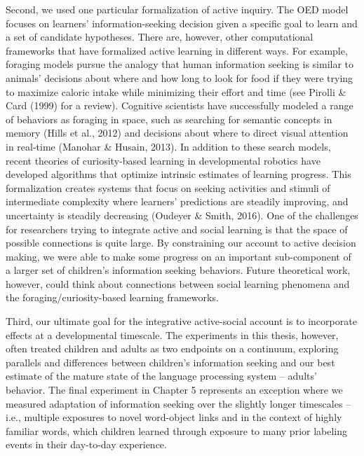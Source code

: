 \documentclass[oneside]{report}
\begin{document}
Second, we used one particular formalization of active inquiry. The OED
model focuses on learners' information-seeking decision given a specific
goal to learn and a set of candidate hypotheses. There are, however,
other computational frameworks that have formalized active learning in
different ways. For example, foraging models pursue the analogy that
human information seeking is similar to animals' decisions about where
and how long to look for food if they were trying to maximize caloric
intake while minimizing their effort and time (see Pirolli \& Card
(1999) for a review). Cognitive scientists have successfully modeled a
range of behaviors as foraging in space, such as searching for semantic
concepts in memory (Hills et al., 2012) and decisions about where to
direct visual attention in real-time (Manohar \& Husain, 2013). In
addition to these search models, recent theories of curiosity-based
learning in developmental robotics have developed algorithms that
optimize intrinsic estimates of learning progress. This formalization
creates systems that focus on seeking activities and stimuli of
intermediate complexity where learners' predictions are steadily
improving, and uncertainty is steadily decreasing (Oudeyer \& Smith,
2016). One of the challenges for researchers trying to integrate active
and social learning is that the space of possible connections is quite
large. By constraining our account to active decision making, we were
able to make some progress on an important sub-component of a larger set
of children's information seeking behaviors. Future theoretical work,
however, could think about connections between social learning phenomena
and the foraging/curiosity-based learning frameworks.

Third, our ultimate goal for the integrative active-social account is to
incorporate effects at a developmental timescale. The experiments in
this thesis, however, often treated children and adults as two endpoints
on a continuum, exploring parallels and differences between children's
information seeking and our best estimate of the mature state of the
language processing system -- adults' behavior. The final experiment in
Chapter 5 represents an exception where we measured adaptation of
information seeking over the slightly longer timescales -- i.e.,
multiple exposures to novel word-object links and in the context of
highly familiar words, which children learned through exposure to many
prior labeling events in their day-to-day experience.
\end{document}
